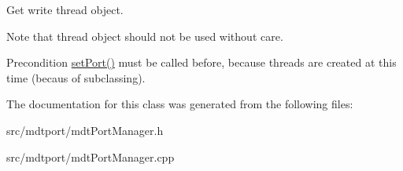 Get write thread object. 

Note that thread object should not be used without care. \begin{DoxyPrecond}{Precondition}
\hyperlink{classmdt_port_manager_afcd156b2d0c9d340999935efb6cd8cb6}{setPort()} must be called before, because threads are created at this time (becaus of subclassing). 
\end{DoxyPrecond}


The documentation for this class was generated from the following files:\begin{DoxyCompactItemize}
\item 
src/mdtport/mdtPortManager.h\item 
src/mdtport/mdtPortManager.cpp\end{DoxyCompactItemize}
